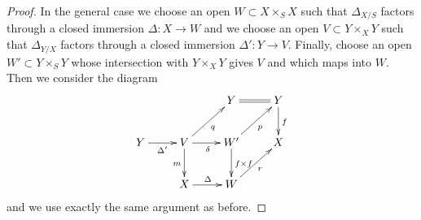 \documentclass{amsart}
\theoremstyle{plain}
\theoremstyle{definition}
\theoremstyle{remark}
\numberwithin{equation}{subsection}
\begin{document}
\begin{proof}
\medskip\noindent
In the general case we choose an open $W \subset X \times_S X$
such that $\Delta_{X/S}$ factors through a closed immersion
$\Delta : X \to W$ and we choose an open $V \subset Y \times_X Y$
such that $\Delta_{Y/X}$ factors through a closed immersion
$\Delta' : Y \to V$. Finally, choose an open
$W' \subset Y \times_S Y$ whose intersection with $Y \times_X Y$
gives $V$ and which maps into $W$. Then we consider the diagram
$$
\xymatrix{
& & Y \ar@{=}[r] & Y \ar[d]^f \\
Y \ar[r]_{\Delta'} &
V \ar[d]_m \ar[r]_\delta \ar[ru]_q &
W' \ar[d]^{f \times f} \ar[ru]_p & X\\
& X \ar[r]^\Delta & W \ar[ru]_r
}
$$
and we use exactly the same argument as before.
\end{proof}
\end{document}
